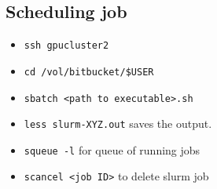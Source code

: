 \documentclass[11pt]{article}
\begin{document}
\subsection*{Scheduling job}

\begin{itemize}
    \item \texttt{ssh gpucluster2}
    \item \texttt{cd /vol/bitbucket/\$USER}
    \item \texttt{sbatch <path to executable>.sh}
    \item \texttt{less slurm-XYZ.out} saves the output.
    \item \verb|squeue -l| for queue of running jobs
    \item \verb|scancel <job ID>| to delete slurm job
\end{itemize}
\end{document}
